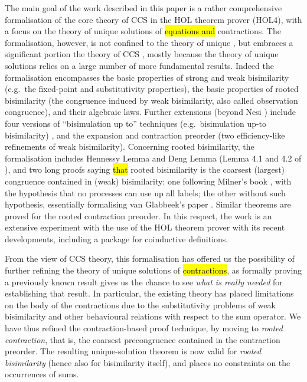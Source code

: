 The main goal of the work described in this paper is a rather
comprehensive formalisation of the core theory of CCS in the HOL
theorem prover (HOL4),  with a focus on the theory of unique solutions
of \hl{equations and} contractions.
The formalisation, however, is not confined to the theory of unique
, but embraces a
significant portion the theory of CCS \cite{Mil89}, mostly because the
theory of unique solutions relies on a large number of more fundamental results.
Indeed the formalisation encompasses the basic properties of strong and weak
bisimilarity (e.g.~the fixed-point and substitutivity properties), the
basic properties of
rooted bisimilarity (the congruence induced by weak
bisimilarity, also called observation congruence), and
their algebraic laws. Further extensions (beyond Nesi
\cite{Nesi:1992ve}) include four versions of ``bisimulation up to''
techniques (e.g.~bisimulation up-to bisimilarity) \cite{Mil89,sangiorgi1992problem}, and the
expansion and contraction preorder (two
efficiency-like refinements of weak bisimilarity). Concerning rooted bisimilarity, the formalisation
includes Hennessy Lemma and Deng Lemma (Lemma 4.1 and 4.2 of
\cite{Gorrieri:2015jt}),
 and two long proofs saying \hl{that}  rooted bisimilarity is the coarsest (largest)
 congruence contained in (weak) bisimilarity: one following Milner's
 book \cite{Mil89}, with the hypothesis that no processes can use up
 all labels;
the other without such hypothesis, essentially formalising van Glabbeek's paper \cite{van2005characterisation}.
Similar theorems are proved for the rooted contraction preorder.
In this respect, the work is an extensive experiment with the use of the HOL theorem prover with its
recent developments, including a package for coinductive definitions.

From the view of CCS theory, this formalisation has offered us the possibility of
further refining the theory of unique solutions of \hl{contractions}, as
formally proving a previously known result gives us the
chance to see \emph{what is really needed} for establishing that result.
In particular, the existing theory \cite{sangiorgi2017equations} has
placed limitations on the body of the contractions due to the
substitutivity problems of weak bisimilarity and other behavioural relations with respect
to the sum operator.
We have thus refined the contraction-based proof technique, by moving to  
\emph{rooted contraction}, that is, the coarsest precongruence contained in the contraction
preorder. The resulting unique-solution theorem is now valid for
\emph{rooted bisimilarity} (hence also for bisimilarity itself), and places no 
constraints on the occurrences of sums.

